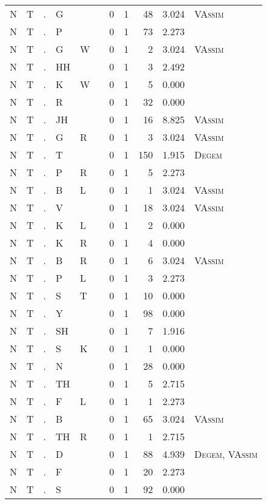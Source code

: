 \begin{longtable}{r@{ } r@{ } c@{ } l@{ } l@{ } l@{ } r r r r l }
N & T & . & G &  &  & 0 & 1 & 48 & 3.024 & \textsc{VAssim} \\
N & T & . & P &  &  & 0 & 1 & 73 & 2.273 &  \\
N & T & . & G & W &  & 0 & 1 & 2 & 3.024 & \textsc{VAssim} \\
N & T & . & HH &  &  & 0 & 1 & 3 & 2.492 &  \\
N & T & . & K & W &  & 0 & 1 & 5 & 0.000 &  \\
N & T & . & R &  &  & 0 & 1 & 32 & 0.000 &  \\
N & T & . & JH &  &  & 0 & 1 & 16 & 8.825 & \textsc{VAssim} \\
N & T & . & G & R &  & 0 & 1 & 3 & 3.024 & \textsc{VAssim} \\
N & T & . & T &  &  & 0 & 1 & 150 & 1.915 & \textsc{Degem} \\
N & T & . & P & R &  & 0 & 1 & 5 & 2.273 &  \\
N & T & . & B & L &  & 0 & 1 & 1 & 3.024 & \textsc{VAssim} \\
N & T & . & V &  &  & 0 & 1 & 18 & 3.024 & \textsc{VAssim} \\
N & T & . & K & L &  & 0 & 1 & 2 & 0.000 &  \\
N & T & . & K & R &  & 0 & 1 & 4 & 0.000 &  \\
N & T & . & B & R &  & 0 & 1 & 6 & 3.024 & \textsc{VAssim} \\
N & T & . & P & L &  & 0 & 1 & 3 & 2.273 &  \\
N & T & . & S & T &  & 0 & 1 & 10 & 0.000 &  \\
N & T & . & Y &  &  & 0 & 1 & 98 & 0.000 &  \\
N & T & . & SH &  &  & 0 & 1 & 7 & 1.916 &  \\
N & T & . & S & K &  & 0 & 1 & 1 & 0.000 &  \\
N & T & . & N &  &  & 0 & 1 & 28 & 0.000 &  \\
N & T & . & TH &  &  & 0 & 1 & 5 & 2.715 &  \\
N & T & . & F & L &  & 0 & 1 & 1 & 2.273 &  \\
N & T & . & B &  &  & 0 & 1 & 65 & 3.024 & \textsc{VAssim} \\
N & T & . & TH & R &  & 0 & 1 & 1 & 2.715 &  \\
N & T & . & D &  &  & 0 & 1 & 88 & 4.939 & \textsc{Degem}, \textsc{VAssim} \\
N & T & . & F &  &  & 0 & 1 & 20 & 2.273 &  \\
N & T & . & S &  &  & 0 & 1 & 92 & 0.000 &  \\

\end{longtable}
